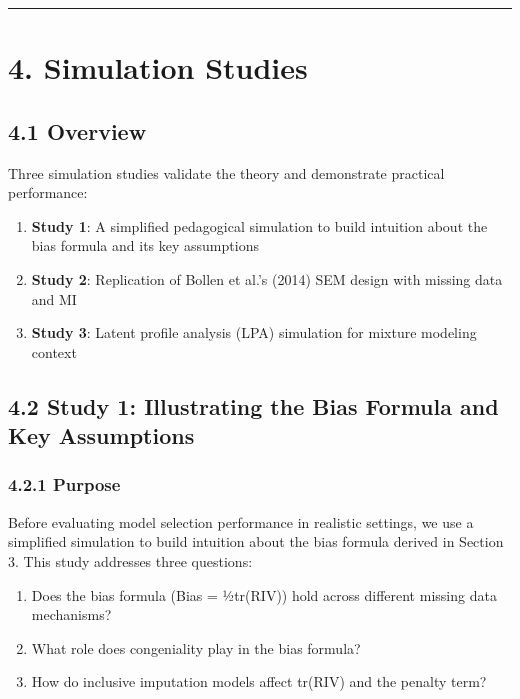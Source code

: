 \documentclass[
]{article}
\providecommand{\tightlist}{%
  \setlength{\itemsep}{0pt}\setlength{\parskip}{0pt}}
\begin{document}
\begin{center}\rule{0.5\linewidth}{0.5pt}\end{center}

\section{4. Simulation Studies}\label{sec-simulation}

\subsection{4.1 Overview}\label{overview}

Three simulation studies validate the theory and demonstrate practical
performance:

\begin{enumerate}
\def\labelenumi{\arabic{enumi}.}
\tightlist
\item
  \textbf{Study 1}: A simplified pedagogical simulation to build
  intuition about the bias formula and its key assumptions
\item
  \textbf{Study 2}: Replication of Bollen et al.'s (2014) SEM design
  with missing data and MI
\item
  \textbf{Study 3}: Latent profile analysis (LPA) simulation for mixture
  modeling context
\end{enumerate}

\subsection{4.2 Study 1: Illustrating the Bias Formula and Key
Assumptions}\label{study-1-illustrating-the-bias-formula-and-key-assumptions}

\subsubsection{4.2.1 Purpose}\label{purpose}

Before evaluating model selection performance in realistic settings, we
use a simplified simulation to build intuition about the bias formula
derived in Section 3. This study addresses three questions:

\begin{enumerate}
\def\labelenumi{\arabic{enumi}.}
\tightlist
\item
  Does the bias formula (Bias = ½tr(RIV)) hold across different missing
  data mechanisms?
\item
  What role does congeniality play in the bias formula?
\item
  How do inclusive imputation models affect tr(RIV) and the penalty
  term?
\end{enumerate}
\end{document}
